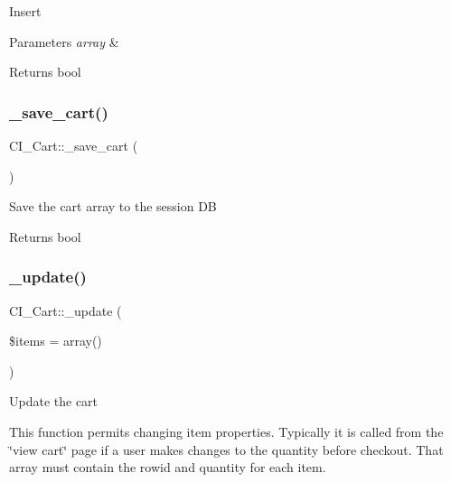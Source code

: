 Insert


\begin{DoxyParams}{Parameters}
{\em array} & \\
\hline
\end{DoxyParams}
\begin{DoxyReturn}{Returns}
bool 
\end{DoxyReturn}
\mbox{\label{class_c_i___cart_a75d067fee3c0af4a956eb80f3224a4e4}} 
\subsubsection{\texorpdfstring{\+\_\+save\+\_\+cart()}{\_save\_cart()}}
{\footnotesize\ttfamily C\+I\+\_\+\+Cart\+::\+\_\+save\+\_\+cart (\begin{DoxyParamCaption}{ }\end{DoxyParamCaption})\hspace{0.3cm}{\ttfamily [protected]}}

Save the cart array to the session DB

\begin{DoxyReturn}{Returns}
bool 
\end{DoxyReturn}
\mbox{\label{class_c_i___cart_ad32aea31bd1348ef53d495d63f72569a}} 
\subsubsection{\texorpdfstring{\+\_\+update()}{\_update()}}
{\footnotesize\ttfamily C\+I\+\_\+\+Cart\+::\+\_\+update (\begin{DoxyParamCaption}\item[{}]{\$items = {\ttfamily array()} }\end{DoxyParamCaption})\hspace{0.3cm}{\ttfamily [protected]}}

Update the cart

This function permits changing item properties. Typically it is called from the \char`\"{}view cart\char`\"{} page if a user makes changes to the quantity before checkout. That array must contain the rowid and quantity for each item.



